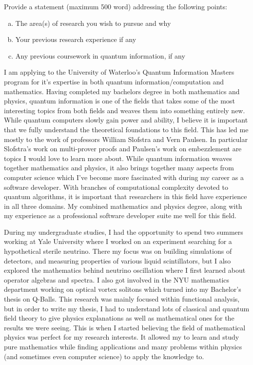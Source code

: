 \documentclass[11pt]{article}
\begin{document}
Provide a statement (maximum 500 word) addressing the following points:
\begin{enumerate}[a)]
    \item The area(s) of research you wish to pursue and why
    \item Your previous research experience if any
    \item Any previous coursework in quantum information, if any
\end{enumerate}

I am applying to the University of Waterloo's Quantum Information Masters program for it's expertise in both quantum information/computation and mathematics. Having completed my bachelors degree in both mathematics and physics, quantum information is one of the fields that takes some of the most interesting topics from both fields and weaves them into something entirely new. While quantum computers slowly gain power and ability, I believe it is important that we fully understand the theoretical foundations to this field. This has led me mostly to the work of professors William Slofstra and Vern Paulsen. In particular Slofstra's work on multi-prover proofs and Paulsen's work on embezzlement are topics I would love to learn more about. While quantum information weaves together mathematics and physics, it also brings together many aspects from computer science which I've become more fascinated with during my career as a software developer. With branches of computational complexity devoted to quantum algorithms, it is important that researchers in this field have experience in all three domains. My combined mathematics and physics degree, along with my experience as a professional software developer suite me well for this field.

During my undergraduate studies, I had the opportunity to spend two summers working at Yale University where I worked on an experiment searching for a hypothetical sterile neutrino. There my focus was on building simulations of detectors, and measuring properties of various liquid scintillators, but I also explored the mathematics behind neutrino oscillation where I first learned about operator algebras and spectra. I also got involved in the NYU mathematics department working on optical vortex solitons which turned into my Bachelor's thesis on Q-Balls. This research was mainly focused within functional analysis, but in order to write my thesis, I had to understand lots of classical and quantum field theory to give physics explanations as well as mathematical ones for the results we were seeing. This is when I started believing the field of mathematical physics was perfect for my research interests. It allowed my to learn and study pure mathematics while finding applications and many problems within physics (and sometimes even computer science) to apply the knowledge to.
\end{document}
